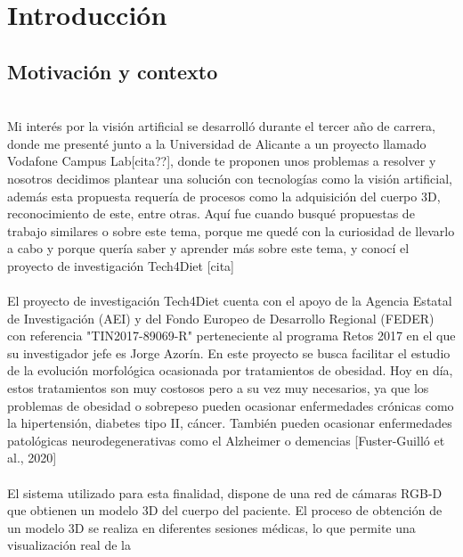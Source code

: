 
\chapter{Introducción}

\section{Motivación y contexto}



\\
	Mi interés por la visión artificial se desarrolló durante el tercer año de carrera, donde me presenté junto a la Universidad de Alicante a un proyecto llamado Vodafone Campus Lab[cita??], donde te proponen unos problemas a resolver y nosotros decidimos plantear una solución con tecnologías como la visión artificial, además esta propuesta requería de procesos como la adquisición del cuerpo 3D, reconocimiento de este, entre otras. Aquí fue cuando busqué propuestas de trabajo similares o sobre este tema, porque me quedé con la curiosidad de llevarlo a cabo y porque quería saber y aprender más sobre este tema, y conocí el proyecto de investigación Tech4Diet [cita]
\\
\\
	El proyecto de investigación Tech4Diet cuenta con el apoyo de la Agencia Estatal de Investigación (AEI) y del Fondo Europeo de Desarrollo Regional (FEDER) con referencia "TIN2017-89069-R" perteneciente al programa Retos 2017 en el que su investigador jefe es Jorge Azorín. En este proyecto se busca facilitar el estudio de la evolución morfológica ocasionada por tratamientos de obesidad. Hoy en día, estos tratamientos son muy costosos pero a su vez muy necesarios, ya que los problemas de obesidad o sobrepeso pueden ocasionar enfermedades crónicas como la hipertensión, diabetes tipo II, cáncer. También pueden ocasionar enfermedades patológicas neurodegenerativas como el Alzheimer o demencias [Fuster-Guilló et al., 2020]
\\
\\
	El sistema utilizado para esta finalidad, dispone de una red de cámaras RGB-D que
	obtienen un modelo 3D del cuerpo del paciente. El proceso de obtención de un modelo 3D se realiza en diferentes sesiones médicas, lo que permite una visualización real de la
